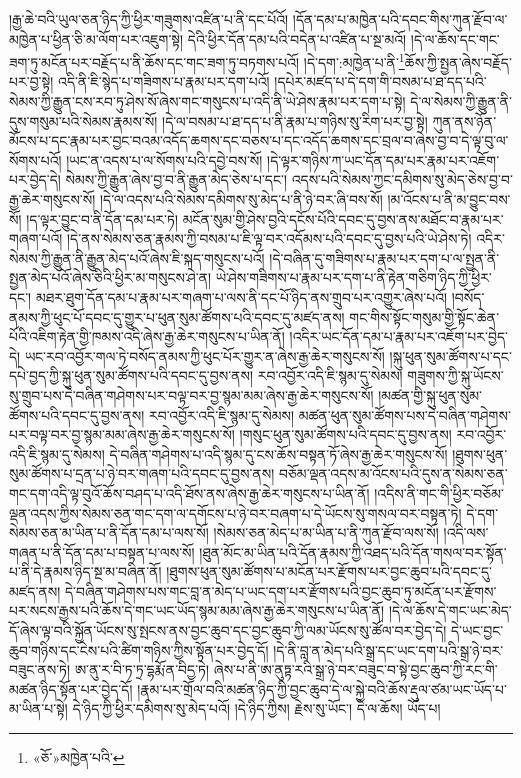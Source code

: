 །རྒྱ་ཆེ་བའི་ཡུལ་ཅན་ཉིད་ཀྱི་ཕྱིར་གཟུགས་འཛིན་པ་ནི་དང་པོའོ། །དོན་དམ་པ་མཁྱེན་པའི་དབང་གིས་ཀུན་རྫོབ་ལ་མཁྱེན་པ་ཕྱིན་ཅི་མ་ལོག་པར་འཇུག་སྟེ། དེའི་ཕྱིར་དོན་དམ་པའི་བདེན་པ་འཛིན་པ་སྔ་མའོ། །དེ་ལ་ཆོས་དང་གང་ཟག་ཏུ་མངོན་པར་བརྗོད་པ་ནི་ཆོས་དང་གང་ཟག་ཏུ་བཏགས་པའོ། །དེ་དག་:མཁྱེན་པ་ནི་\footnote{«ཅོ་»མཁྱེན་པའི་}ཆོས་ཀྱི་སྤྱན་ཞེས་བརྗོད་པར་བྱ་སྟེ། འདི་ནི་ཇི་སྙེད་པ་གཟིགས་པ་རྣམ་པར་དག་པའོ། །དཔེར་མཛད་པ་དེ་དག་གི་བསམ་པ་ཐ་དད་པའི་སེམས་ཀྱི་རྒྱུན་ངས་རབ་ཏུ་ཤེས་སོ་ཞེས་གང་གསུངས་པ་འདི་ནི་ཡེ་ཤེས་རྣམ་པར་དག་པ་སྟེ། དེ་ལ་སེམས་ཀྱི་རྒྱུན་ནི་དུས་གསུམ་པའི་སེམས་རྣམས་སོ། །དེ་ལ་བསམ་པ་ཐ་དད་པ་ནི་རྣམ་པ་གཉིས་སུ་རིག་པར་བྱ་སྟེ། ཀུན་ནས་ཉོན་མོངས་པ་དང་རྣམ་པར་བྱང་བའམ་འདོད་ཆགས་དང་བཅས་པ་དང་འདོད་ཆགས་དང་བྲལ་བ་ཞེས་བྱ་བ་དེ་ལྟ་བུ་ལ་སོགས་པའོ། །ཡང་ན་འདས་པ་ལ་སོགས་པའི་དབྱེ་བས་སོ། །དེ་ལྟར་གཉིས་ཀ་ཡང་དོན་དམ་པར་རྣམ་པར་འཇོག་པར་བྱེད་དེ། སེམས་ཀྱི་རྒྱུན་ཞེས་བྱ་བ་ནི་རྒྱུན་མེད་ཅེས་པ་དང་། འདས་པའི་སེམས་ཀྱང་དམིགས་སུ་མེད་ཅེས་བྱ་བ་རྒྱ་ཆེར་གསུངས་སོ། །དེ་ལ་འདས་པའི་སེམས་དམིགས་སུ་མེད་པ་ནི་ཉེ་བར་ཞི་བས་སོ། །མ་འོངས་པ་ནི་མ་བྱུང་བས་སོ། །ད་ལྟར་བྱུང་བ་ནི་དོན་དམ་པར་ཏེ། མངོན་སུམ་གྱི་ཤེས་བྱའི་དངོས་པོའི་དབང་དུ་བྱས་ནས་མཐོང་བ་རྣམ་པར་གཞག་པའོ། །དེ་ནས་སེམས་ཅན་རྣམས་ཀྱི་བསམ་པ་ཇི་ལྟ་བར་འདོམས་པའི་དབང་དུ་བྱས་པའི་ཡེ་ཤེས་ཏེ། འདིར་སེམས་ཀྱི་རྒྱུན་ནི་རྒྱུན་མེད་པའོ་ཞེས་ཇི་སྐད་གསུངས་པའོ། །དེ་བཞིན་དུ་གཟིགས་པ་རྣམ་པར་དག་པ་ལ་སྤྱན་ནི་སྤྱན་མེད་པའོ་ཞེས་ཅིའི་ཕྱིར་མ་གསུངས་ཤེ་ན། ཡེ་ཤེས་གཟིགས་པ་རྣམ་པར་དག་པ་ནི་རྟེན་གཅིག་ཉིད་ཀྱི་ཕྱིར་དང་། མཐར་ཐུག་དོན་དམ་པ་རྣམ་པར་གཞག་པ་ལས་ནི་དང་པོ་ཉིད་ནས་གྲུབ་པར་འགྱུར་ཞེས་པའོ། །བསོད་ནམས་ཀྱི་ཕུང་པོ་དབང་དུ་གྱུར་པ་ཕུན་སུམ་ཚོགས་པའི་དབང་དུ་མཛད་ནས། གང་གིས་སྟོང་གསུམ་གྱི་སྟོང་ཆེན་པོའི་འཇིག་རྟེན་གྱི་ཁམས་འདི་ཞེས་རྒྱ་ཆེར་གསུངས་པ་ཡིན་ནོ། །འདིར་ཡང་དོན་དམ་པ་རྣམ་པར་འཇོག་པར་བྱེད་དེ། ཡང་རབ་འབྱོར་གལ་ཏེ་བསོད་ནམས་ཀྱི་ཕུང་པོར་གྱུར་ན་ཞེས་རྒྱ་ཆེར་གསུངས་སོ། །སྐུ་ཕུན་སུམ་ཚོགས་པ་དང་དཔེ་བྱད་ཀྱི་སྐུ་ཕུན་སུམ་ཚོགས་པའི་དབང་དུ་བྱས་ནས། རབ་འབྱོར་འདི་ཇི་སྙམ་དུ་སེམས། གཟུགས་ཀྱི་སྐུ་ཡོངས་སུ་གྲུབ་པས་དེ་བཞིན་གཤེགས་པར་བལྟ་བར་བྱ་སྙམ་མམ་ཞེས་རྒྱ་ཆེར་གསུངས་སོ། །མཚན་གྱི་སྐུ་ཕུན་སུམ་ཚོགས་པའི་དབང་དུ་བྱས་ནས། རབ་འབྱོར་འདི་ཇི་སྙམ་དུ་སེམས། མཚན་ཕུན་སུམ་ཚོགས་པས་དེ་བཞིན་གཤེགས་པར་བལྟ་བར་བྱ་སྙམ་མམ་ཞེས་རྒྱ་ཆེར་གསུངས་སོ། །གསུང་ཕུན་སུམ་ཚོགས་པའི་དབང་དུ་བྱས་ནས། རབ་འབྱོར་འདི་ཇི་སྙམ་དུ་སེམས། དེ་བཞིན་གཤེགས་པ་འདི་སྙམ་དུ་ངས་ཆོས་བསྟན་ཏོ་ཞེས་རྒྱ་ཆེར་གསུངས་སོ། །ཐུགས་ཕུན་སུམ་ཚོགས་པ་དྲན་པ་ཉེ་བར་གཞག་པའི་དབང་དུ་བྱས་ནས། བཅོམ་ལྡན་འདས་མ་འོངས་པའི་དུས་ན་སེམས་ཅན་གང་དག་འདི་ལྟ་བུའོ་ཆོས་བཤད་པ་འདི་ཐོས་ནས་ཞེས་རྒྱ་ཆེར་གསུངས་པ་ཡིན་ནོ། །འདིས་ནི་གང་གི་ཕྱིར་བཅོམ་ལྡན་འདས་ཀྱིས་སེམས་ཅན་གང་དག་ལ་དགོངས་པ་ཉེ་བར་བཞག་པ་དེ་ཡོངས་སུ་གསལ་བར་བསྟན་ཏེ། དེ་དག་སེམས་ཅན་མ་ཡིན་པ་ནི་དོན་དམ་པ་ལས་སོ། །སེམས་ཅན་མེད་པ་མ་ཡིན་པ་ནི་ཀུན་རྫོབ་ལས་སོ། །འདི་ལས་གཞན་པ་ནི་དོན་དམ་པ་བསྟན་པ་ལས་སོ། །ཐུན་མོང་མ་ཡིན་པའི་དོན་རྣམས་ཀྱི་འཐད་པའི་དོན་གསལ་བར་སྟོན་པ་ནི་དེ་རྣམས་ཉིད་སྔ་མ་བཞིན་ནོ། །ཐུགས་ཕུན་སུམ་ཚོགས་པ་མངོན་པར་རྫོགས་པར་བྱང་ཆུབ་པའི་དབང་དུ་མཛད་ནས། དེ་བཞིན་གཤེགས་པས་གང་བླ་ན་མེད་པ་ཡང་དག་པར་རྫོགས་པའི་བྱང་ཆུབ་ཏུ་མངོན་པར་རྫོགས་པར་སངས་རྒྱས་པའི་ཆོས་དེ་གང་ཡང་ཡོད་སྙམ་མམ་ཞེས་རྒྱ་ཆེར་གསུངས་པ་ཡིན་ནོ། །དེ་ལ་ཆོས་དེ་གང་ཡང་མེད་དོ་ཞེས་ལྟ་བའི་སྐྱོན་ཡོངས་སུ་སྤངས་ནས་བྱང་ཆུབ་དང་བྱང་ཆུབ་ཀྱི་ལམ་ཡོངས་སུ་ཚོལ་བར་བྱེད་དེ། དེ་ཡང་བྱང་ཆུབ་གཉིས་དང་ངེས་པའི་ཚིག་གཉིས་ཀྱིས་སྟོན་པར་བྱེད་དོ། །དེ་ནི་བླ་ན་མེད་པའི་སྒྲ་དང་ཡང་དག་པའི་སྒྲ་ཉེ་བར་བཟུང་ནས་ཏེ། ཨ་ནུ་ར་བི་ཏ་ཏྲ་དྷརྨོ་ན་བིདྱ་ཏེ། ཞེས་པ་ནི་ཨ་ནུཏྟ་རའི་སྒྲ་ཉེ་བར་བཟུང་བ་སྟེ་བྱང་ཆུབ་ཀྱི་རང་གི་མཚན་ཉིད་སྟོན་པར་བྱེད་དོ། །རྣམ་པར་གྲོལ་བའི་མཚན་ཉིད་ཀྱི་བྱང་ཆུབ་དེ་ལ་སྐྱེ་བའི་ཆོས་རྡུལ་ཙམ་ཡང་ཡོད་པ་མ་ཡིན་པ་སྟེ། དེ་ཉིད་ཀྱི་ཕྱིར་དམིགས་སུ་མེད་པའོ། །དེ་ཉིད་ཀྱིས། རྗེས་སུ་ཡོང་། དེ་ལ་ཆོས། ཡོད་པ། 